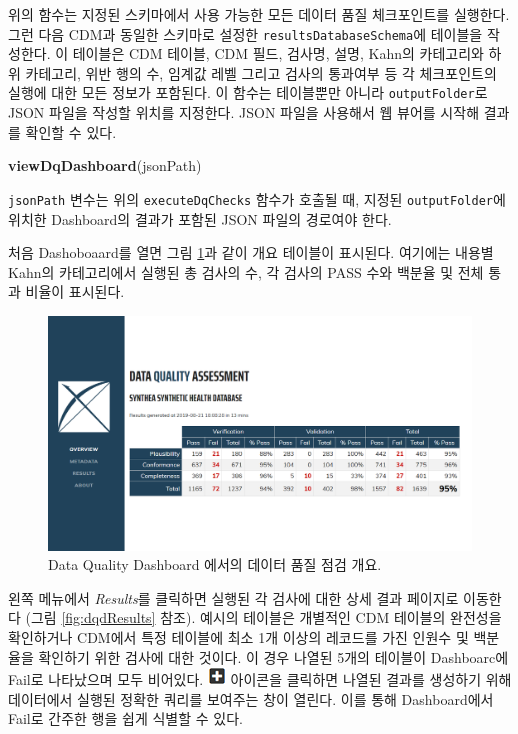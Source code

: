 \documentclass[10.5pt]{book}
\newenvironment{Shaded}{\begin{snugshade}}{\end{snugshade}}
\newcommand{\KeywordTok}[1]{\textcolor[rgb]{0.13,0.29,0.53}{\textbf{#1}}}
\newcommand{\NormalTok}[1]{#1}
\theoremstyle{definition}
\theoremstyle{definition}
\theoremstyle{definition}
\theoremstyle{remark}
\begin{document}
위의 함수는 지정된 스키마에서 사용 가능한 모든 데이터 품질 체크포인트를
실행한다. 그런 다음 CDM과 동일한 스키마로 설정한
\texttt{resultsDatabaseSchema}에 테이블을 작성한다. 이 테이블은 CDM
테이블, CDM 필드, 검사명, 설명, Kahn의 카테고리와 하위 카테고리, 위반
행의 수, 임계값 레벨 그리고 검사의 통과여부 등 각 체크포인트의 실행에
대한 모든 정보가 포함된다. 이 함수는 테이블뿐만 아니라
\texttt{outputFolder}로 JSON 파일을 작성할 위치를 지정한다. JSON 파일을
사용해서 웹 뷰어를 시작해 결과를 확인할 수 있다.

\begin{Shaded}
\begin{Highlighting}[]
\KeywordTok{viewDqDashboard}\NormalTok{(jsonPath)}
\end{Highlighting}
\end{Shaded}

\texttt{jsonPath} 변수는 위의 \texttt{executeDqChecks} 함수가 호출될 때,
지정된 \texttt{outputFolder}에 위치한 Dashboard의 결과가 포함된 JSON
파일의 경로여야 한다.

처음 Dashoboaard를 열면 그림 \ref{fig:dqdOverview}과 같이 개요 테이블이
표시된다. 여기에는 내용별 Kahn의 카테고리에서 실행된 총 검사의 수, 각
검사의 PASS 수와 백분율 및 전체 통과 비율이 표시된다.

\begin{figure}

{\centering \includegraphics[width=1\linewidth]{images/DataQuality/dqdOverview} 

}

\caption{Data Quality Dashboard 에서의 데이터 품질 점검 개요.}\label{fig:dqdOverview}
\end{figure}

왼쪽 메뉴에서 \emph{Results}를 클릭하면 실행된 각 검사에 대한 상세 결과
페이지로 이동한다 (그림 \ref{fig:dqdResults} 참조). 예시의 테이블은
개별적인 CDM 테이블의 완전성을 확인하거나 CDM에서 특정 테이블에 최소 1개
이상의 레코드를 가진 인원수 및 백분율을 확인하기 위한 검사에 대한
것이다. 이 경우 나열된 5개의 테이블이 Dashboarc에 Fail로 나타났으며 모두
비어있다. \includegraphics{images/DataQuality/plusIcon.png} 아이콘을
클릭하면 나열된 결과를 생성하기 위해 데이터에서 실행된 정확한 쿼리를
보여주는 창이 열린다. 이를 통해 Dashboard에서 Fail로 간주한 행을 쉽게
식별할 수 있다.
\end{document}
